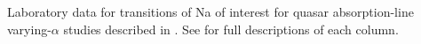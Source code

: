 Laboratory data for transitions of Na of interest for quasar absorption-line varying-$\alpha$ studies described in . See  for full descriptions of each column.
